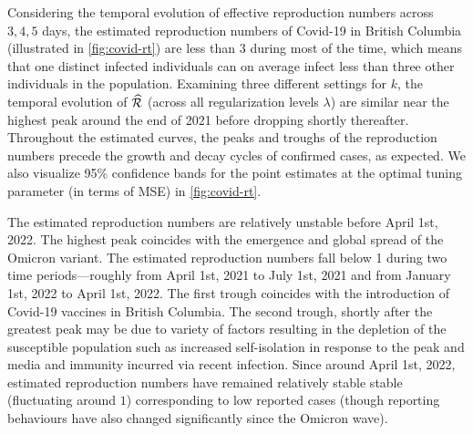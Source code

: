 Considering the temporal evolution of effective reproduction numbers across $3,
4, 5$ days, the estimated reproduction numbers of Covid-19 in British Columbia
(illustrated in \autoref{fig:covid-rt}) are less than $3$ during most of the
time, which means that one distinct infected individuals can on average infect
less than three other individuals in the population.  Examining three different settings for $k$,
the temporal evolution of $\widehat{\mathcal{R}}$ (across all regularization levels
$\lambda$) are similar near the highest peak around the end of 2021 before
dropping shortly thereafter. Throughout the estimated curves, the peaks and
troughs of the reproduction numbers precede the growth and decay cycles of
confirmed cases, as expected. We also visualize 95\% confidence bands for the
point estimates at the optimal tuning parameter (in terms of MSE) in \autoref{fig:covid-rt}.  

The estimated reproduction numbers are relatively unstable before April 1st,
2022. The highest peak coincides with the emergence and global spread of the
Omicron variant. The estimated reproduction numbers fall below 1 during two time
periods---roughly from April 1st, 2021 to July 1st, 2021 and from January 1st,
2022 to April 1st, 2022. The first trough coincides with the introduction of
Covid-19 vaccines in British Columbia. The second trough, shortly after the
greatest peak may be due to variety of factors resulting in the depletion of the
susceptible population such as increased self-isolation in response to the peak
and media and immunity incurred via recent infection. Since around April 1st,
2022, estimated reproduction numbers have remained relatively stable stable
(fluctuating around $1$) corresponding to low reported cases (though reporting
behaviours have also changed significantly since the Omicron wave). 


